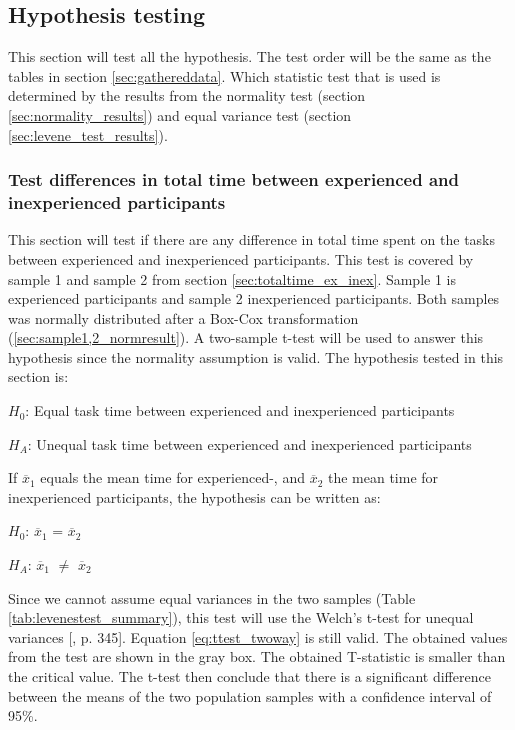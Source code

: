 \vspace{0.5cm}

\subsection{Hypothesis testing}\label{sec:hypothesis_results}
This section will test all the hypothesis. The test order will be the same as the tables in section \ref{sec:gathereddata}. Which statistic test that is used is determined by the results from the normality test (section \ref{sec:normality_results}) and equal variance test (section \ref{sec:levene_test_results}).

\subsubsection[Sample 1, 2]{Test differences in total time between experienced and inexperienced participants}\label{sec:t-test_result} 
This section will test if there are any difference in total time spent on the tasks between experienced and inexperienced participants. This test is covered by sample 1 and sample 2 from section \ref{sec:totaltime_ex_inex}. Sample 1 is experienced participants and sample 2 inexperienced participants. Both samples was normally distributed after a Box-Cox transformation (\ref{sec:sample1,2_normresult}). A two-sample t-test will be used to answer this hypothesis since the normality assumption is valid. The hypothesis tested in this section is: \\[0.3cm]

\centerline{$H_{0}$: Equal task time between experienced and inexperienced participants} 
\centerline{$H_{A}$: Unequal task time between experienced and inexperienced participants}

\vspace{0.3cm}

If $\overline{x}_1$ equals the mean time for experienced-, and $\overline{x}_2$ the mean time for inexperienced participants, the hypothesis can be written as:\\[0.3cm]

\centerline{$H_{0}$: $\overline{x}_1$ = $\overline{x}_2$} 
\centerline{$H_{A}$: $\overline{x}_1$ $\neq$ $\overline{x}_2$}

\vspace{0.3cm}

Since we cannot assume equal variances in the two samples (Table \ref{tab:levenestest_summary}), this test will use the Welch's t-test for unequal variances [\citep{Walpole2012}, p. 345]. Equation \ref{eq:ttest_twoway} is still valid. The obtained values from the test are shown in the gray box. The obtained T-statistic is smaller than the critical value. The t-test then conclude that there is a significant difference between the means of the two population samples with a confidence interval of 95\%.\\[0.2cm]


